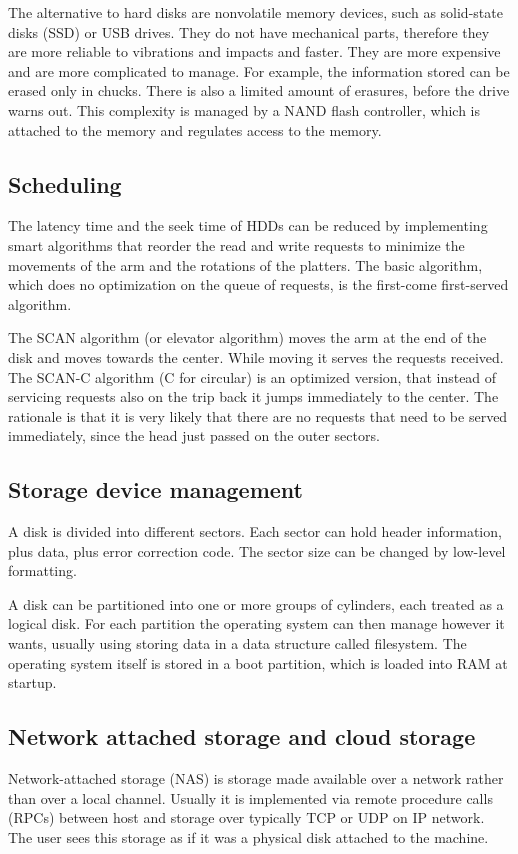 The alternative to hard disks are nonvolatile memory devices, such as solid-state disks (SSD) or USB drives. They do not have mechanical parts, therefore they are more reliable to vibrations and impacts and faster. They are more expensive and are more complicated to manage. For example, the information stored can be erased only in chucks. There is also a limited amount of erasures, before the drive warns out. This complexity is managed by a NAND flash controller, which is attached to the memory and regulates access to the memory.

\subsection{Scheduling}
The latency time and the seek time of HDDs can be reduced by implementing smart algorithms that reorder the read and write requests to minimize the movements of the arm and the rotations of the platters. The basic algorithm, which does no optimization on the queue of requests, is the first-come first-served algorithm.

The SCAN algorithm (or elevator algorithm) moves the arm at the end of the disk and moves towards the center. While moving it serves the requests received. The SCAN-C algorithm (C for circular) is an optimized version, that instead of servicing requests also on the trip back it jumps immediately to the center. The rationale is that it is very likely that there are no requests that need to be served immediately, since the head just passed on the outer sectors.

\subsection{Storage device management}
A disk is divided into different sectors. Each sector can hold header information, plus data, plus error correction code. The sector size can be changed by low-level formatting.

A disk can be partitioned into one or more groups of cylinders, each treated as a logical disk. For each partition the operating system can then manage however it wants, usually using storing data in a data structure called filesystem. The operating system itself is stored in a boot partition, which is loaded into RAM at startup.

\subsection{Network attached storage and cloud storage}
Network-attached storage (NAS) is storage made available over a network rather than over a local channel. Usually it is implemented via remote procedure calls (RPCs) between host and storage over typically TCP or UDP on IP network. The user sees this storage as if it was a physical disk attached to the machine.

